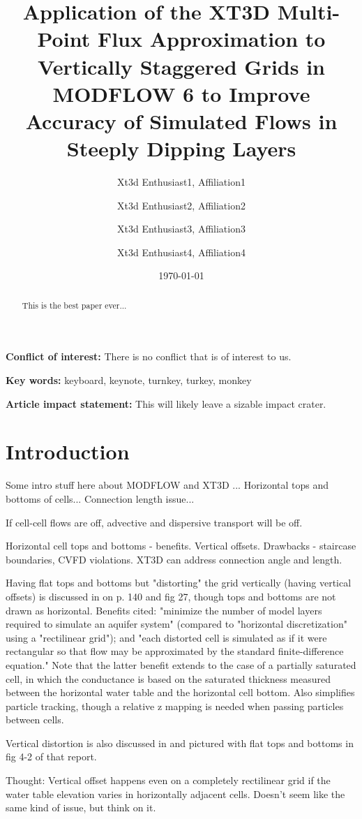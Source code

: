 \documentclass{article}
\title{Application of the XT3D Multi-Point Flux Approximation to Vertically Staggered Grids in MODFLOW 6 to Improve Accuracy of Simulated Flows in Steeply Dipping Layers}
\author{
	Xt3d Enthusiast1, Affiliation1  \\
	\and 
	Xt3d Enthusiast2, Affiliation2 \\
	\and 
	Xt3d Enthusiast3, Affiliation3 \\
	\and 
	Xt3d Enthusiast4, Affiliation4 \\
	}
\date{\today}
\begin{document}
\maketitle

\textbf{Conflict of interest:} There is no conflict that is of interest to us.

\textbf{Key words:} keyboard, keynote, turnkey, turkey, monkey

\textbf{Article impact statement:} This will likely leave a sizable impact crater.

\begin{abstract}
This is the best paper ever...
\end{abstract}

\section{Introduction}

Some intro stuff here about MODFLOW \citep{modflow6framework, modflow6gwf, modflow6gwt} and XT3D \citep{modflow6xt3d}... Horizontal tops and bottoms of cells... Connection length issue...

If cell-cell flows are  off, advective and dispersive transport will be off.

Horizontal cell tops and bottoms - benefits.  Vertical offsets.  Drawbacks - staircase boundaries, CVFD violations.  XT3D can address connection angle and length.

Having flat tops and bottoms but "distorting" the grid vertically (having vertical offsets) is discussed in \cite{modflow84} on p. 140 and fig 27, though tops and bottoms are not drawn as horizontal. Benefits cited: "minimize the number of model layers required to simulate an aquifer system" (compared to "horizontal discretization" using a "rectilinear grid"); and "each distorted cell is simulated as if it were rectangular so that flow may be approximated by the standard finite-difference equation." Note that the latter benefit extends to the case of a partially saturated cell, in which the conductance is based on the saturated thickness measured between the horizontal water table and the horizontal cell bottom. Also simplifies particle tracking, though a relative z mapping is needed when passing particles between cells.

Vertical distortion is also discussed in \cite{modflow2005} and pictured with flat tops and bottoms in fig 4-2 of that report.

Thought: Vertical offset happens even on a completely rectilinear grid if the water table elevation varies in horizontally adjacent cells. Doesn't seem like the same kind of issue, but think on it.
\end{document}
